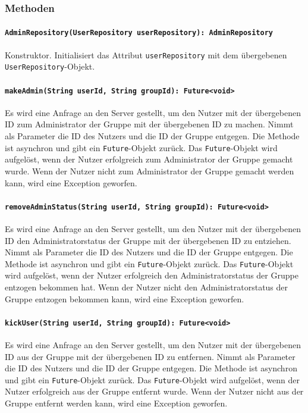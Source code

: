 \documentclass{entwurfsheft}
\begin{document}
\subsubsection*{Methoden}
\paragraph{\texttt{AdminRepository(UserRepository userRepository): AdminRepository}}
Konstruktor. Initialisiert das Attribut \texttt{userRepository} mit dem übergebenen \texttt{UserRepository}-Objekt.
\paragraph{\texttt{makeAdmin(String userId, String groupId): Future<void>}}
Es wird eine Anfrage an den Server gestellt, um den Nutzer mit der übergebenen ID zum Administrator der Gruppe mit der übergebenen ID zu machen. Nimmt als Parameter die ID des Nutzers und die ID der Gruppe entgegen. Die Methode ist asynchron und gibt ein \texttt{Future}-Objekt zurück. Das \texttt{Future}-Objekt wird aufgelöst, wenn der Nutzer erfolgreich zum Administrator der Gruppe gemacht wurde. Wenn der Nutzer nicht zum Administrator der Gruppe gemacht werden kann, wird eine Exception geworfen.

\paragraph{\texttt{removeAdminStatus(String userId, String groupId): Future<void>}}
Es wird eine Anfrage an den Server gestellt, um den Nutzer mit der übergebenen ID den Administratorstatus der Gruppe mit der übergebenen ID zu entziehen. Nimmt als Parameter die ID des Nutzers und die ID der Gruppe entgegen. Die Methode ist asynchron und gibt ein \texttt{Future}-Objekt zurück. Das \texttt{Future}-Objekt wird aufgelöst, wenn der Nutzer erfolgreich den Administratorstatus der Gruppe entzogen bekommen hat. Wenn der Nutzer nicht den Administratorstatus der Gruppe entzogen bekommen kann, wird eine Exception geworfen.
\paragraph{\texttt{kickUser(String userId, String groupId): Future<void>}}
Es wird eine Anfrage an den Server gestellt, um den Nutzer mit der übergebenen ID aus der Gruppe mit der übergebenen ID zu entfernen. Nimmt als Parameter die ID des Nutzers und die ID der Gruppe entgegen. Die Methode ist asynchron und gibt ein \texttt{Future}-Objekt zurück. Das \texttt{Future}-Objekt wird aufgelöst, wenn der Nutzer erfolgreich aus der Gruppe entfernt wurde. Wenn der Nutzer nicht aus der Gruppe entfernt werden kann, wird eine Exception geworfen.
\end{document}
